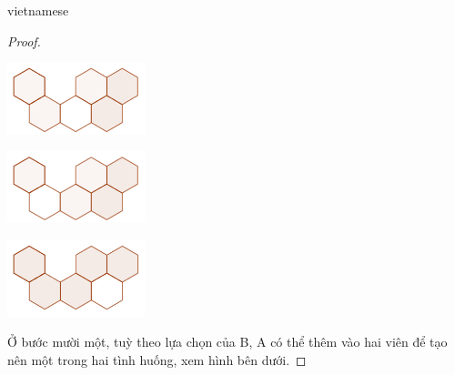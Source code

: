\documentclass{article}
\begin{document}
\begin{otherlanguage*}{vietnamese}
\begin{proof}
    \begin{center}
        \centering
        \begin{minipage}[t]{4cm}
            \begin{center}
                \includegraphics[width=4cm]{./svg/pdf/pi-2024-1-p3-10a.pdf}
            \end{center}
        \end{minipage}
        \quad
        \begin{minipage}[t]{4cm}
            \begin{center}
                \includegraphics[width=4cm]{./svg/pdf/pi-2024-1-p3-10b.pdf}
            \end{center}
        \end{minipage}
        \qquad
        \begin{minipage}[t]{4cm}
            \begin{center}
                \includegraphics[width=4cm]{./svg/pdf/pi-2024-1-p3-10c.pdf}
            \end{center}
        \end{minipage}
    \end{center}

    Ở bước mười một, tuỳ theo lựa chọn của B, A có thể thêm vào hai viên để tạo nên một trong hai tình huống, xem hình bên dưới.


\end{proof}
\end{otherlanguage*}
\end{document}

